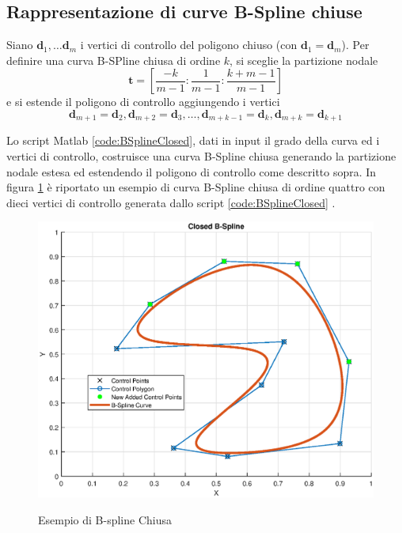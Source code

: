 \documentclass[a4paper, 12pt]{article}
\begin{document}


\subsection{Rappresentazione di curve B-Spline chiuse}
Siano $\mathbf{d}_1,\dots \mathbf{d}_m$ i vertici di controllo del poligono chiuso (con $\mathbf{d}_1 = \mathbf{d}_m$). 
Per definire una curva B-SPline chiusa di ordine $k$, si sceglie la partizione nodale $$\mathbf{t} = \left[ \frac{-k}{m-1} : \frac{1}{m-1} : \frac{k+m-1}{m-1} \right]$$
e si estende il poligono di controllo  aggiungendo i vertici $$\mathbf{d}_{m+1} = \mathbf{d}_2,\mathbf{d}_{m+2} = \mathbf{d}_3, \dots, \mathbf{d}_{m+k-1} = \mathbf{d}_k, \mathbf{d}_{m+k} = \mathbf{d}_{k+1} $$

Lo script Matlab \ref{code:BSplineClosed}, dati in input il grado della curva ed i vertici di controllo, costruisce una curva B-Spline chiusa generando la partizione nodale estesa ed estendendo il poligono di controllo come descritto sopra. In figura \ref{fig:BSplineClosed} è riportato un esempio di curva B-Spline chiusa di ordine quattro con dieci vertici di controllo generata dallo script \ref{code:BSplineClosed} .



\begin{figure}[!]
	\centering
	\caption{Esempio di B-spline Chiusa}
	\includegraphics[scale=0.7]{closed_plot.eps}
	\label{fig:BSplineClosed}
\end{figure}
\end{document}
